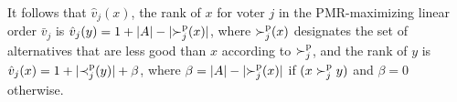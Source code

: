 \noindent It follows that $\hat{v}_{j}(x)$, the rank of $x$ for voter $j$ in the PMR-maximizing linear order $\bar{v}_{j}$ %
is $\hat{v}_{j}(y) = 1+\lvert A\rvert-\lvert{\succ^\text{p}_j}(x)\rvert$, where ${\succ^\text{p}_j}(x)$ designates the set of alternatives that are less good than $x$ according to $\succ^\text{p}_j$, and the rank of $y$ is $\hat{v}_{j}(x)=1+\lvert{\prec^\text{p}_j}(y)\rvert+\beta$, where $\beta = \lvert A\rvert - \lvert{\succ^\text{p}_j}(x)\rvert$ if $(x \succ^\text{p}_j y)$ and $\beta = 0$ otherwise.


